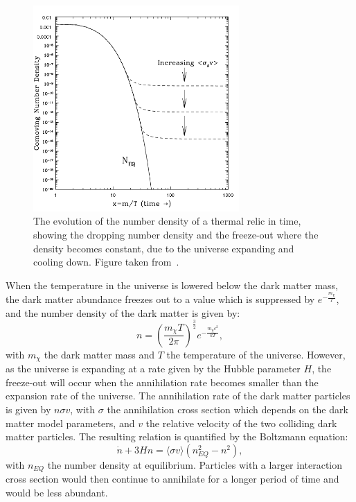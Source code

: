 \begin{itemize}
\begin{figure}[ht]
  \centering
  \includegraphics[width=0.7\textwidth]{freezeout.png}\hfill%
  \caption{The evolution of the number density of a thermal relic in time, showing the dropping number density and the freeze-out where the density becomes constant, due to the universe expanding and cooling down. Figure taken from~\cite{Hooper:2009zm}.}
  \label{fig:freezeout}
\end{figure}

	 When the temperature in the universe is lowered below the dark matter mass, the dark matter abundance freezes out to a value which is suppressed by $e^{-\frac{m_{\chi}}{T}}$, and the number density of the dark matter is given by:
	 \begin{equation}
	  n = \left(\frac{m_{\chi}T}{2\pi} \right)^{\frac{3}{2}} e^{-\frac{m_{\chi}c^2}{kT}},
	 \end{equation}
	 with $m_{\chi}$ the dark matter mass and $T$ the temperature of the universe. However, as the universe is expanding at a rate given by the Hubble parameter $H$, the freeze-out will occur when the annihilation rate becomes smaller than the expansion rate of the universe. The annihilation rate of the dark matter particles is given by $n\sigma v$, with $\sigma$ the annihilation cross section which depends on the dark matter model parameters, and $v$ the relative velocity of the two colliding dark matter particles. The resulting relation is quantified by the Boltzmann equation:
	 \begin{equation}
	  \dot{n} + 3Hn = \langle \sigma v \rangle \left(n_{EQ}^2 - n^2\right),
	 \end{equation}
	 with $n_{EQ}$ the number density at equilibrium. Particles with a larger interaction cross section would then continue to annihilate for a longer period of time and would be less abundant. 
         

\end{itemize}
